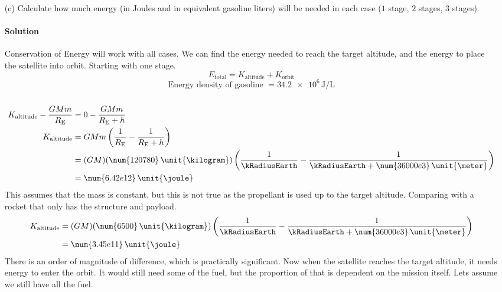 \documentclass{article}
\begin{document}
{\begin{enumerate}
\begin{enumerate}
		\clearpage
		
 		\end{enumerate}
 		\item[(c)] Calculate how much energy (in Joules and in equivalent gasoline liters) will be needed in each case ($1$ stage, $2$ stages, $3$ stages). \\

		\paragraph{Solution} Conservation of Energy will work with all cases. We can find the energy needed to reach the target altitude, and the energy to place the satellite into orbit. Starting with one stage.
		\[
			E_\mathrm{total} = K_\mathrm{altitude} + K_\mathrm{orbit} 
		\]
		\[
			\text{Energy density of gasoline } = \num{34.2e6} \, \unit{\joule\per\liter}
		\] \\
		\begin{equation*}
			\begin{split}
				K_\mathrm{altitude} - \frac{GMm}{R_\mathrm{E}} &= 0 - \frac{GMm}{R_\mathrm{E} + h} \\
				K_\mathrm{altitude} &= GMm \left(\frac{1}{R_\mathrm{E}} - \frac{1}{R_\mathrm{E} + h}\right) \\
				&= (GM)(\num{120780} \, \unit{\kilogram})\left(\frac{1}{\kRadiusEarth} - \frac{1}{\kRadiusEarth + \num{36000e3} \, \unit{\meter}}\right) \\
				&= \num{6.42e12} \, \unit{\joule}
			\end{split}
		\end{equation*}
		This assumes that the mass is constant, but this is not true as the propellant is used up to the target altitude. Comparing with a rocket that only has the structure and payload.
		\begin{equation*}
			\begin{split}
				K_\mathrm{altitude} &= (GM)(\num{6500} \, \unit{\kilogram})\left(\frac{1}{\kRadiusEarth} - \frac{1}{\kRadiusEarth + \num{36000e3} \, \unit{\meter}}\right) \\
				&= \num{3.45e11} \, \unit{\joule}
			\end{split}
		\end{equation*}
		There is an order of magnitude of difference, which is practically significant.
		Now when the satellite reaches the target altitude, it needs energy to enter the orbit. It would still need some of the fuel, but the proportion of that is dependent on the mission itself. Lets assume we still have all the fuel.

\end{enumerate}}
\end{document}
